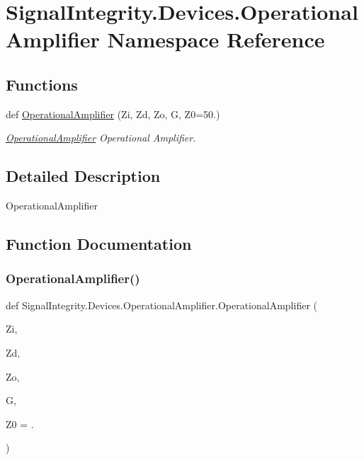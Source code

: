 \hypertarget{namespaceSignalIntegrity_1_1Devices_1_1OperationalAmplifier}{}\section{Signal\+Integrity.\+Devices.\+Operational\+Amplifier Namespace Reference}
\label{namespaceSignalIntegrity_1_1Devices_1_1OperationalAmplifier}
\subsection*{Functions}
\begin{DoxyCompactItemize}
\item 
def \hyperlink{namespaceSignalIntegrity_1_1Devices_1_1OperationalAmplifier_a853765fd7325b8a7cd47fc028946e93b}{Operational\+Amplifier} (Zi, Zd, Zo, G, Z0=50.)
\begin{DoxyCompactList}\small\item\em \hyperlink{namespaceSignalIntegrity_1_1Devices_1_1OperationalAmplifier}{Operational\+Amplifier} Operational Amplifier. \end{DoxyCompactList}\end{DoxyCompactItemize}


\subsection{Detailed Description}
\begin{DoxyVerb}OperationalAmplifier\end{DoxyVerb}
 

\subsection{Function Documentation}
\mbox{\label{namespaceSignalIntegrity_1_1Devices_1_1OperationalAmplifier_a853765fd7325b8a7cd47fc028946e93b}} 
\subsubsection{\texorpdfstring{Operational\+Amplifier()}{OperationalAmplifier()}}
{\footnotesize\ttfamily def Signal\+Integrity.\+Devices.\+Operational\+Amplifier.\+Operational\+Amplifier (\begin{DoxyParamCaption}\item[{}]{Zi,  }\item[{}]{Zd,  }\item[{}]{Zo,  }\item[{}]{G,  }\item[{}]{Z0 = {.} }\end{DoxyParamCaption})}



